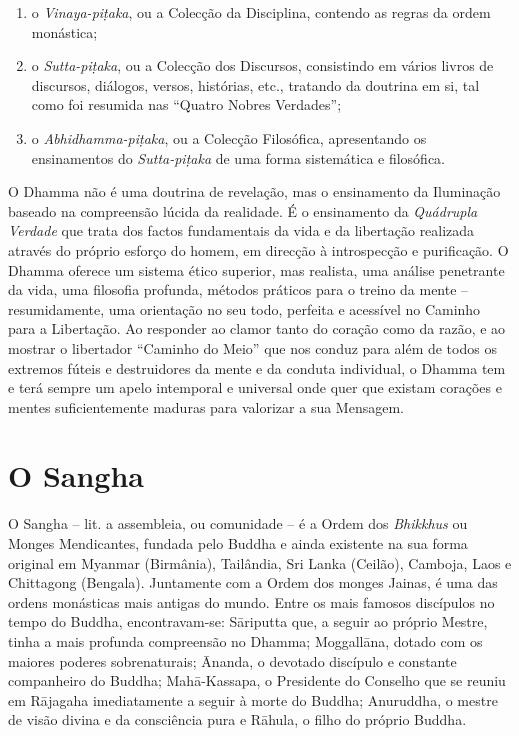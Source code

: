 \begin{enumerate}
  \item o \emph{Vinaya-piṭaka}, ou a Colecção da Disciplina, contendo as regras
        da ordem monástica;

  \item o \emph{Sutta-piṭaka}, ou a Colecção dos Discursos, consistindo em
        vários livros de discursos, diálogos, versos, histórias, etc., tratando
        da doutrina em si, tal como foi resumida nas ``Quatro Nobres Verdades'';

  \item o \emph{Abhidhamma-piṭaka}, ou a Colecção Filosófica, apresentando os
        ensinamentos do \emph{Sutta-piṭaka} de uma forma sistemática e
        filosófica.
\end{enumerate}

O Dhamma não é uma doutrina de revelação, mas o ensinamento da Iluminação
baseado na compreensão lúcida da realidade. É o ensinamento da \emph{Quádrupla
  Verdade} que trata dos factos fundamentais da vida e da libertação realizada
através do próprio esforço do homem, em direcção à introspecção e purificação. O
Dhamma oferece um sistema ético superior, mas realista, uma análise
penetrante da vida, uma filosofia profunda, métodos práticos para o treino da
mente -- resumidamente, uma orientação no seu todo, perfeita e acessível no
Caminho para a Libertação. Ao responder ao clamor tanto do coração como da
razão, e ao mostrar o libertador ``Caminho do Meio'' que nos conduz para além de
todos os extremos fúteis e destruidores da mente e da conduta individual, o
Dhamma tem e terá sempre um apelo intemporal e universal onde quer que
existam corações e mentes suficientemente maduras para valorizar a sua Mensagem.

\section{O Sangha}

O Sangha -- lit. a assembleia, ou comunidade -- é a Ordem dos \emph{Bhikkhus} ou
Monges Mendicantes, fundada pelo Buddha e ainda existente na sua forma original
em Myanmar (Birmânia), Tailândia, Sri Lanka (Ceilão), Camboja, Laos e Chittagong
(Bengala). Juntamente com a Ordem dos monges Jainas, é uma das ordens monásticas
mais antigas do mundo. Entre os mais famosos discípulos no tempo do Buddha,
encontravam-se: Sāriputta que, a seguir ao próprio Mestre, tinha a mais profunda
compreensão no Dhamma; Moggallāna, dotado com os maiores poderes
sobrenaturais; Ānanda, o devotado discípulo e constante companheiro do Buddha;
Mahā-Kassapa, o Presidente do Conselho que se reuniu em Rājagaha imediatamente a
seguir à morte do Buddha; Anuruddha, o mestre de visão divina e da consciência
pura e Rāhula, o filho do próprio Buddha.

